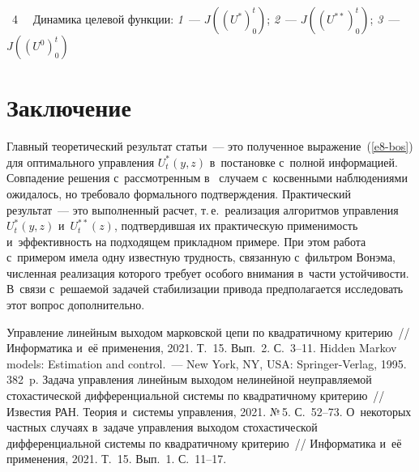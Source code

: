 \begin{multicols}{2}
{\begin{center}
\end{center}


\noindent
{{\figurename~4}\ \ \small{
Динамика целевой функции: \textit{1}~--- $J((U^*)_0^t)$; \textit{2}~--- 
$J((U^{**})_0^t)$; \textit{3}~--- $J((U^0)_0^t)$
}}}

\vspace*{-6pt}



\section{Заключение}

     Главный теоретический результат статьи~--- это полученное 
выражение~(\ref{e8-bos}) для оптимального управ\-ле\-ния $U_t^*(y,z)$ 
в~постановке с~полной информацией. Совпадение решения с~рассмотренным 
в~\cite{1-bos} случаем с~косвенными наблюдениями ожидалось, но требовало 
формального подтверждения. Практический результат~--- это выполненный 
расчет, т.\,е.\ реализация алгоритмов управления $U_t^*(y,z)$ 
и~$U_t^{**}(z)$, подтвердившая их практическую применимость 
и~эффективность на подходящем прикладном примере. При этом работа 
с~примером имела одну известную  
труд\-ность, связанную с~фильтром Вонэма, численная реализация которого 
требует особого внимания в~части устойчивости. В~связи с~решаемой 
задачей стабилизации привода предполагается исследовать этот вопрос 
дополнительно.

     
{\small\frenchspacing
 {\baselineskip=12pt
 \begin{thebibliography}{99}
 Управление линейным выходом марковской цепи по квадратичному 
критерию~// Информатика и~её применения, 2021. Т.~15. Вып.~2. С.~3--11.
 Hidden Markov models: Estimation and control.~--- 
New York, NY, USA: Springer-Verlag, 1995. 382~p.
 Задача управления линейным выходом нелинейной неуправляемой 
стохастической дифференциальной системы по квадратичному критерию~// Известия 
РАН. Теория и~системы управления, 2021. №\,5. С.~52--73.
 О~некоторых частных случаях в~задаче управления выходом 
стохастической дифференциальной системы по квадратичному критерию~// Информатика 
и~её применения, 2021. Т.~15. Вып.~1. С.~11--17.


\end{thebibliography}}}
\end{multicols}
